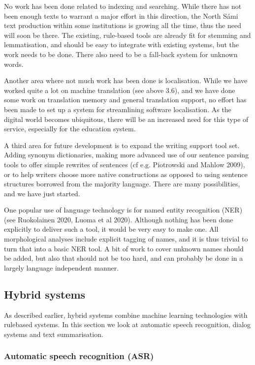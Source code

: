 \documentclass[free]{flammie}
\begin{document}
No work has been done related to indexing and searching. While there has not been
enough texts to warrant a major effort in this direction, the North Sámi text production
within some institutions is growing all the time, thus the need will soon be there. The existing, rule-based tools are already fit for stemming and lemmatisation, and should be easy
to integrate with existing systems, but the work needs to be done. There also need to be a
fall-back system for unknown words.

Another area where not much work has been done is localisation. While we have
worked quite a lot on machine translation (see above 3.6), and we have done some work
on translation memory and general translation support, no effort has been made to set up a
system for streamlining software localisation. As the digital world becomes ubiquitous,
there will be an increased need for this type of service, especially for the education system.

A third area for future development is to expand the writing support tool set. Adding
synonym dictionaries, making more advanced use of our sentence parsing tools to offer
simple rewrites of sentences (cf e.g. Piotrowski and Mahlow 2009), or to help writers
choose more native constructions as opposed to using sentence structures borrowed from
the majority language. There are many possibilities, and we have just started.

One popular use of language technology is for named entity recognition (NER) (see
Ruokolainen 2020, Luoma et al 2020). Although nothing has been done explicitly to deliver
such a tool, it would be very easy to make one. All morphological analyses include explicit
tagging of names, and it is thus trivial to turn that into a basic NER tool. A bit of work to
cover unknown names should be added, but also that should not be too hard, and can probably be done in a largely language independent manner.

\subsection{Hybrid systems}

As described earlier, hybrid systems combine machine learning technologies with rulebased systems. In this section we look at automatic speech recognition, dialog systems and
text summarisation.

\subsubsection{Automatic speech recognition (ASR)}
\end{document}

